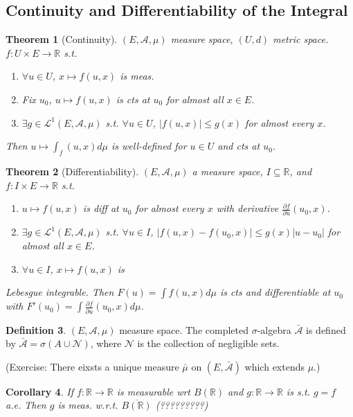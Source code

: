 \documentclass{article}
\theoremstyle{definition}
\newtheorem{defn}{Definition}[section]
\theoremstyle{remark}
\theoremstyle{plain}
\newtheorem{thm}[defn]{Theorem}
\newtheorem{crly}[defn]{Corollary}
\newcommand{\RR}{\mathbb{R}}
\begin{document}
\subsection{Continuity and Differentiability of the Integral}
\begin{thm}[Continuity]
    $(E,\mathcal{A},\mu)$ measure space, $(U,d)$ metric space. $f:U\times E\to\RR$ s.t.
    \begin{enumerate}
        \item $\forall u\in U$, $x\mapsto f(u,x)$ is meas.
        \item Fix $u_0$, $u\mapsto f(u,x)$ is cts at $u_0$ for almost all $x\in E$.
        \item $\exists g\in \mathcal{L}^1(E,\mathcal{A},\mu)$ s.t. $\forall u\in U$, $|f(u,x)|\le g(x)$ for almost every $x$.
    \end{enumerate}
    Then $u\mapsto \int_f(u,x)d\mu$ is well-defined for $u\in U$ and cts at $u_0$.
\end{thm}
\begin{thm}[Differentiability]
    $(E,\mathcal{A},\mu)$ a measure space, $I\subseteq\RR$, and $f:I\times E\to\RR$ s.t.
    \begin{enumerate}
        \item $u\mapsto f(u,x)$ is diff at $u_0$ for almost every $x$ with derivative $\frac{\partial f}{\partial u}(u_0,x)$.
        \item $\exists g\in\mathcal{L}^1(E,\mathcal{A},\mu)$ s.t. $\forall u\in I$, $|f(u,x)-f(u_0,x)|\le g(x)|u-u_0|$ for almost all $x\in E$.
        \item $\forall u\in I$, $x\mapsto f(u,x)$ is 
    \end{enumerate}Lebesgue integrable.
        Then $F(u)=\int f(u,x)d\mu$ is cts and differentiable at $u_0$ with $F'(u_0)=\int\frac{\partial f}{\partial u}(u_0,x)d\mu$.
\end{thm}
\begin{defn}
    $(E,\mathcal{A},\mu)$ measure space. The completed $\sigma$-algebra $\bar{\mathcal{A}}$ is defined by $\bar{\mathcal{A}}=\sigma(A\cup\mathcal{N})$, where $\mathcal{N}$ is the collection of negligible sets.
\end{defn}
(Exercise: There eixsts a unique measure $\bar\mu$ on $(E,\bar{\mathcal{A}})$ which extends $\mu$.)
\begin{crly}
    If $f:\RR\to\RR$ is measurable wrt $B(\RR)$ and $g:\RR\to \RR$ is s.t. $g=f$ a.e. Then $g$ is meas. w.r.t. $\overline{B(\RR)}$ (?????????)
\end{crly}
\end{document}
